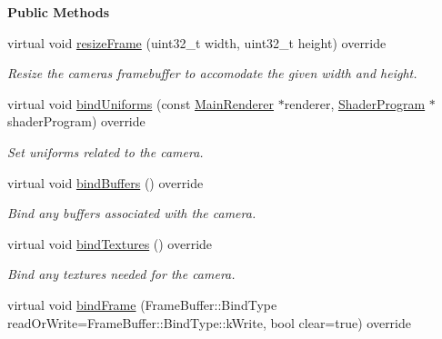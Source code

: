 \begin{Indent}\textbf{ Public Methods}\par
\begin{DoxyCompactItemize}
\item 
virtual void \mbox{\hyperlink{classrev_1_1_point_light_camera_afff4fe381e8872b5db8cbc7f573e3ca9}{resize\+Frame}} (uint32\+\_\+t width, uint32\+\_\+t height) override
\begin{DoxyCompactList}\small\item\em Resize the camera\textquotesingle{}s framebuffer to accomodate the given width and height. \end{DoxyCompactList}\item 
virtual void \mbox{\hyperlink{classrev_1_1_point_light_camera_a461e93ecc428b95ad7b7a244e143f924}{bind\+Uniforms}} (const \mbox{\hyperlink{classrev_1_1_main_renderer}{Main\+Renderer}} $\ast$renderer, \mbox{\hyperlink{classrev_1_1_shader_program}{Shader\+Program}} $\ast$shader\+Program) override
\begin{DoxyCompactList}\small\item\em Set uniforms related to the camera. \end{DoxyCompactList}\item 
\mbox{\label{classrev_1_1_point_light_camera_a04bd8c97785a08672c644469f005b2c6}} 
virtual void \mbox{\hyperlink{classrev_1_1_point_light_camera_a04bd8c97785a08672c644469f005b2c6}{bind\+Buffers}} () override
\begin{DoxyCompactList}\small\item\em Bind any buffers associated with the camera. \end{DoxyCompactList}\item 
\mbox{\label{classrev_1_1_point_light_camera_a64222ae971eeebe2dc5334cdff42a6a9}} 
virtual void \mbox{\hyperlink{classrev_1_1_point_light_camera_a64222ae971eeebe2dc5334cdff42a6a9}{bind\+Textures}} () override
\begin{DoxyCompactList}\small\item\em Bind any textures needed for the camera. \end{DoxyCompactList}\item 
\mbox{\label{classrev_1_1_point_light_camera_a80efac8e7d45791803dc426753ed0dc8}} 
virtual void \mbox{\hyperlink{classrev_1_1_point_light_camera_a80efac8e7d45791803dc426753ed0dc8}{bind\+Frame}} (Frame\+Buffer\+::\+Bind\+Type read\+Or\+Write=Frame\+Buffer\+::\+Bind\+Type\+::k\+Write, bool clear=true) override

\end{DoxyCompactItemize}
\end{Indent}
